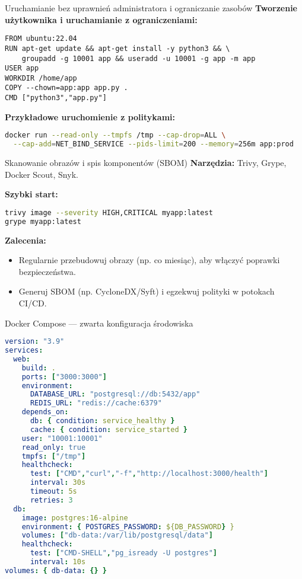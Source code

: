 \documentclass[10pt, aspectratio=169]{beamer}
\begin{document}
\begin{frame}[fragile]{Uruchamianie bez uprawnień administratora i ograniczanie zasobów}
\textbf{Tworzenie użytkownika i uruchamianie z ograniczeniami:}
\begin{lstlisting}[language=Docker,basicstyle=\ttfamily\tiny]
FROM ubuntu:22.04
RUN apt-get update && apt-get install -y python3 && \
    groupadd -g 10001 app && useradd -u 10001 -g app -m app
USER app
WORKDIR /home/app
COPY --chown=app:app app.py .
CMD ["python3","app.py"]
\end{lstlisting}

\textbf{Przykładowe uruchomienie z politykami:}
\begin{lstlisting}[language=bash,basicstyle=\ttfamily\scriptsize]
docker run --read-only --tmpfs /tmp --cap-drop=ALL \
  --cap-add=NET_BIND_SERVICE --pids-limit=200 --memory=256m app:prod
\end{lstlisting}
\end{frame}

\begin{frame}[fragile]{Skanowanie obrazów i spis komponentów (SBOM)}
\textbf{Narzędzia:} Trivy, Grype, Docker Scout, Snyk.

\textbf{Szybki start:}
\begin{lstlisting}[language=bash,basicstyle=\ttfamily\scriptsize]
trivy image --severity HIGH,CRITICAL myapp:latest
grype myapp:latest
\end{lstlisting}

\textbf{Zalecenia:}
\begin{itemize}
  \item Regularnie przebudowuj obrazy (np. co miesiąc), aby włączyć poprawki bezpieczeństwa.
  \item Generuj SBOM (np. CycloneDX/Syft) i egzekwuj polityki w potokach CI/CD.
\end{itemize}
\end{frame}

\begin{frame}{Docker Compose — zwarta konfiguracja środowiska}
\begin{lstlisting}[language=yaml,basicstyle=\ttfamily\tiny]
version: "3.9"
services:
  web:
    build: .
    ports: ["3000:3000"]
    environment:
      DATABASE_URL: "postgresql://db:5432/app"
      REDIS_URL: "redis://cache:6379"
    depends_on:
      db: { condition: service_healthy }
      cache: { condition: service_started }
    user: "10001:10001"
    read_only: true
    tmpfs: ["/tmp"]
    healthcheck:
      test: ["CMD","curl","-f","http://localhost:3000/health"]
      interval: 30s
      timeout: 5s
      retries: 3
  db:
    image: postgres:16-alpine
    environment: { POSTGRES_PASSWORD: ${DB_PASSWORD} }
    volumes: ["db-data:/var/lib/postgresql/data"]
    healthcheck:
      test: ["CMD-SHELL","pg_isready -U postgres"]
      interval: 10s
volumes: { db-data: {} }
\end{lstlisting}
\end{frame}
\end{document}
